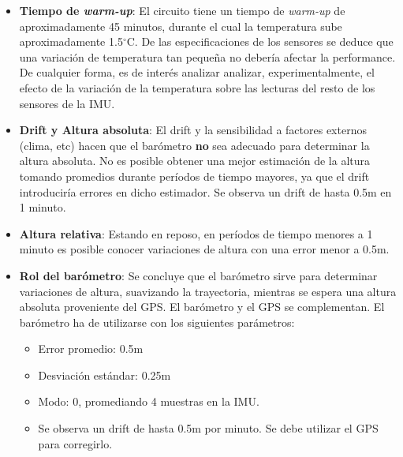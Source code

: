 \documentclass[main]{subfiles}
\newcommand{\degc}{$^\circ$C}
\begin{document}
\begin{itemize}
\item \textbf{Tiempo de \textit{warm-up}}: El circuito tiene un tiempo de \textit{warm-up} de aproximadamente 45 minutos, durante el cual la temperatura sube aproximadamente 1.5\degc. De las especificaciones de los sensores se deduce que una variaci\'on de temperatura tan peque\~na no deber\'ia afectar la performance. De cualquier forma, es de inter\'es analizar analizar, experimentalmente, el efecto de la variaci\'on de la temperatura sobre las lecturas del resto de los sensores de la IMU.
\item \textbf{Drift y Altura absoluta}: El drift y la sensibilidad a factores externos (clima, etc) hacen que el bar\'ometro \textbf{no} sea adecuado para determinar la altura absoluta. No es posible obtener una mejor estimaci\'on de la altura tomando promedios durante per\'iodos de tiempo mayores, ya que el drift introducir\'ia errores en dicho estimador. Se observa un drift de hasta 0.5m en 1 minuto.
\item \textbf{Altura relativa}: Estando en reposo, en per\'iodos de tiempo menores a 1 minuto es posible conocer variaciones de altura con una error menor a 0.5m.
\item \textbf{Rol del bar\'ometro}: Se concluye que el bar\'ometro sirve para determinar variaciones de altura, suavizando la trayectoria, mientras se espera una altura absoluta proveniente del GPS. El bar\'ometro y el GPS se complementan. El bar\'ometro ha de utilizarse con los siguientes par\'ametros:
  \begin{itemize}
  \item Error promedio: 0.5m
  \item Desviaci\'on est\'andar: 0.25m
  \item Modo: 0, promediando 4 muestras en la IMU.
  \item Se observa un drift de hasta 0.5m por minuto. Se debe utilizar el GPS para corregirlo.
  \end{itemize}
\end{itemize}
\end{document}
